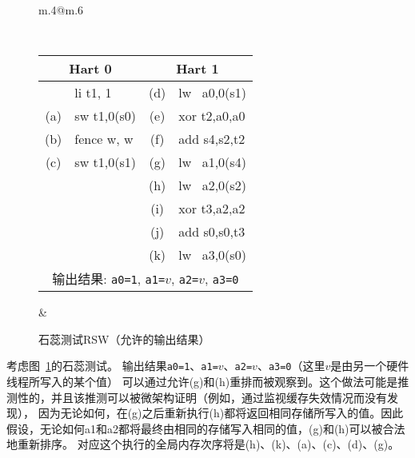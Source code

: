 \begin{figure}[h!]
  \centering
  \begin{tabular}{m{.4\linewidth}@{\qquad\quad}m{.6\linewidth}}
  {
    \tt\small
    \begin{tabular}{cl||cl}
    \multicolumn{2}{c}{Hart 0} & \multicolumn{2}{c}{Hart 1} \\
    \hline
          & li t1, 1    & (d) & lw~ a0,0(s1) \\
      (a) & sw t1,0(s0) & (e) & xor t2,a0,a0 \\
      (b) & fence w, w  & (f) & add s4,s2,t2 \\
      (c) & sw t1,0(s1) & (g) & lw~ a1,0(s4) \\
          &             & (h) & lw~ a2,0(s2) \\
          &             & (i) & xor t3,a2,a2 \\
          &             & (j) & add s0,s0,t3 \\
          &             & (k) & lw~ a3,0(s0) \\
      \hline
      \multicolumn{4}{c}{输出结果: {\tt a0=1}, {\tt a1=$v$}, {\tt a2=$v$}, {\tt a3=0}}
    \end{tabular}
  }
  &
  
   \end{tabular}
  \caption{石蕊测试RSW（允许的输出结果） 
  }
  \label{fig:litmus:rsw}
\end{figure}

考虑图~\ref{fig:litmus:rsw}的石蕊测试。
输出结果{\tt a0=1}、{\tt a1=$v$}、{\tt a2=$v$}、{\tt a3=0}（这里$v$是由另一个硬件线程所写入的某个值）
可以通过允许(g)和(h)重排而被观察到。这个做法可能是推测性的，并且该推测可以被微架构证明（例如，通过监视缓存失效情况而没有发现），
因为无论如何，在(g)之后重新执行(h)都将返回相同存储所写入的值。因此假设，无论如何a1和a2都将最终由相同的存储写入相同的值，(g)和(h)可以被合法地重新排序。
对应这个执行的全局内存次序将是(h)、(k)、(a)、(c)、(d)、(g)。

